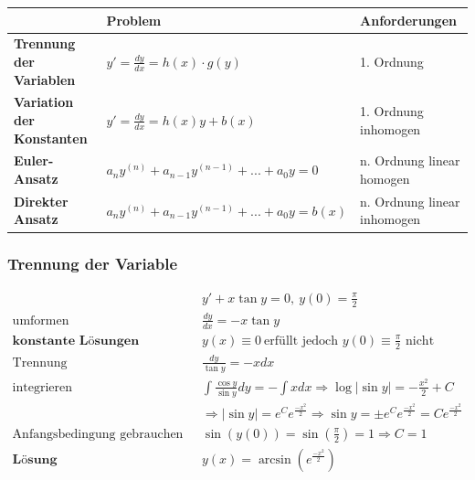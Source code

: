 \begin{table}[H]
\centering
\begin{tabular}{|p{3cm}|p{6cm}|p{3cm}|}
\hline
                                  	& \textbf{Problem} 							& \textbf{Anforderungen} 			\\ \hline
\textbf{Trennung der Variablen}   	& $y' = \frac{dy}{dx} = h(x) \cdot g(y)$ 	& 1. Ordnung			            \\ \hline
\textbf{Variation der Konstanten}	& $y' = \frac{dy}{dx} = h(x)y + b(x)$	 	& 1. Ordnung \filbreak inhomogen	\\ \hline
\textbf{Euler-Ansatz}				& $a_{n}y^{(n)} + a_{n-1}y^{(n-1)} + ... + a_{0}y = 0$	 	& n. Ordnung \filbreak linear \filbreak homogen	\\ \hline
\textbf{Direkter Ansatz}				& $a_{n}y^{(n)} + a_{n-1}y^{(n-1)} + ... + a_{0}y = b(x)$	& n. Ordnung \filbreak linear \filbreak inhomogen	\\ \hline

\end{tabular}
\end{table}

\subsubsection{Trennung der Variable}

\begin{equation*}
\begin{split}
	& y' + x \tan y = 0,\ y(0) = \frac{\pi}{2} \\
	\text{umformen}\quad & \frac{dy}{dx} = -x \tan y \\
	\textbf{konstante L{\"o}sungen}\quad & y(x) \equiv 0\ \text{erf{\"u}llt jedoch $y(0) \equiv \frac{\pi}{2}$ nicht} \\
	\text{Trennung}\quad & \frac{dy}{\tan y} = -x dx \\
	\text{integrieren}\quad & \int\frac{\cos y}{\sin y}dy = - \int xdx \Rightarrow \log|\sin y| = -\frac{x^2}{2} + C \\
	& \Rightarrow |\sin y| = e^Ce^{\frac{-x^2}{2}} \Rightarrow \sin y = \pm e^Ce^{\frac{-x^2}{2}} = Ce^{\frac{-x^2}{2}} \\
	\text{Anfangsbedingung gebrauchen}\quad & \sin(y(0)) = \sin (\frac{\pi}{2}) = 1 \Rightarrow C = 1 \\
	\textbf{L{\"o}sung}\quad & y(x) = \arcsin (e^{\frac{-x^2}{2}})
\end{split}
\end{equation*}

